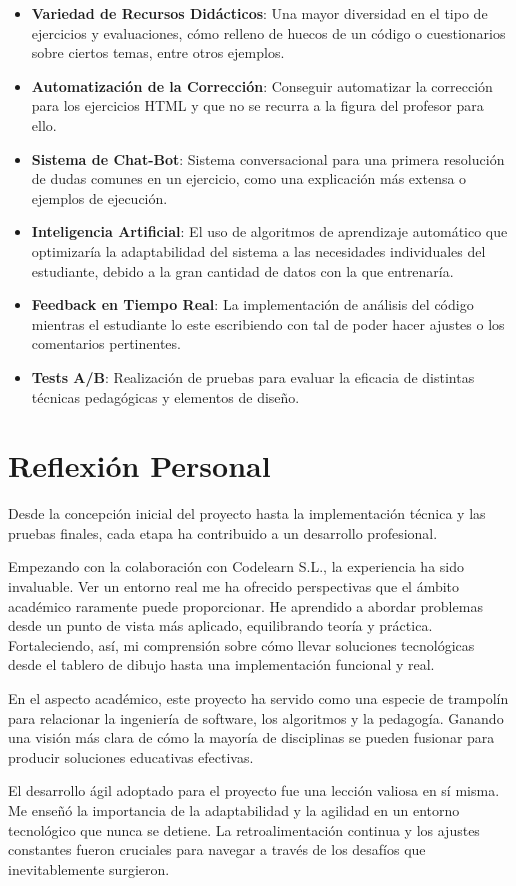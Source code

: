 \begin{itemize}
    \item \textbf{Variedad de Recursos Didácticos}: Una mayor diversidad en el tipo de ejercicios y evaluaciones, cómo relleno de huecos de un código o cuestionarios sobre ciertos temas, entre otros ejemplos.
    \item \textbf{Automatización  de la Corrección}: Conseguir automatizar la corrección para los ejercicios HTML y que no se recurra a la figura del profesor para ello. 
    \item \textbf{Sistema de Chat-Bot}: Sistema conversacional para una primera resolución de dudas comunes en un ejercicio, como una explicación más extensa o ejemplos de ejecución.  
    \item \textbf{Inteligencia Artificial}: El uso de algoritmos de aprendizaje automático que optimizaría la adaptabilidad del sistema a las necesidades individuales del estudiante, debido a la gran cantidad de datos con la que entrenaría.
    \item \textbf{Feedback en Tiempo Real}: La implementación de análisis del código mientras el estudiante lo este escribiendo con tal de poder hacer ajustes o los comentarios pertinentes.
    \item \textbf{Tests A/B}: Realización de pruebas para evaluar la eficacia de distintas técnicas pedagógicas y elementos de diseño.
  \end{itemize}

\section{Reflexión Personal}
Desde la concepción inicial del proyecto hasta la implementación técnica y las pruebas finales, cada etapa ha contribuido a un desarrollo profesional.

Empezando con la colaboración con Codelearn S.L., la experiencia ha sido invaluable. Ver un entorno real me ha ofrecido perspectivas que el ámbito académico raramente puede proporcionar. He aprendido a abordar problemas desde un punto de vista más aplicado, equilibrando teoría y práctica. Fortaleciendo, así, mi comprensión sobre cómo llevar soluciones tecnológicas desde el tablero de dibujo hasta una implementación funcional y real.

En el aspecto académico, este proyecto ha servido como una especie de trampolín para relacionar la ingeniería de software, los algoritmos y la pedagogía. Ganando una visión más clara de cómo la mayoría de disciplinas se pueden fusionar para producir soluciones educativas efectivas. 

El desarrollo ágil adoptado para el proyecto fue una lección valiosa en sí misma. Me enseñó la importancia de la adaptabilidad y la agilidad en un entorno tecnológico que nunca se detiene. La retroalimentación continua y los ajustes constantes fueron cruciales para navegar a través de los desafíos que inevitablemente surgieron.

